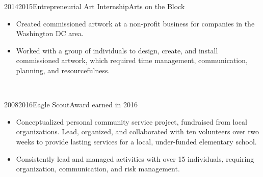 \documentclass[10pt,a4paper,ragged2e,withhyper]{cvclass}
\begin{document}
\begin{paracol}{2}
\begin{mycolumn}
    \begin{cvdateevent}{2014}{2015}{Entrepreneurial Art Internship}{Arts on the Block}
        \begin{itemize}
            \item Created commissioned artwork at a non-profit business for companies in the Washington DC area.
            \item Worked with a group of individuals to design, create, and install commissioned artwork, which required time management, communication, planning, and resourcefulness.
        \end{itemize}
    \end{cvdateevent}
    \divider\\

    \begin{cvdateevent}{2008}{2016}{Eagle Scout}{Award earned in 2016}
        \begin{itemize}
            \item Conceptualized personal community service project, fundraised from local organizations. Lead, organized, and collaborated with ten volunteers over two weeks to provide lasting services for a local, under-funded elementary school.
            \item Consistently lead and managed activities with over 15 individuals, requiring organization, communication, and risk management.
        \end{itemize}
    \end{cvdateevent}

\end{mycolumn}
\end{paracol}
\end{document}

